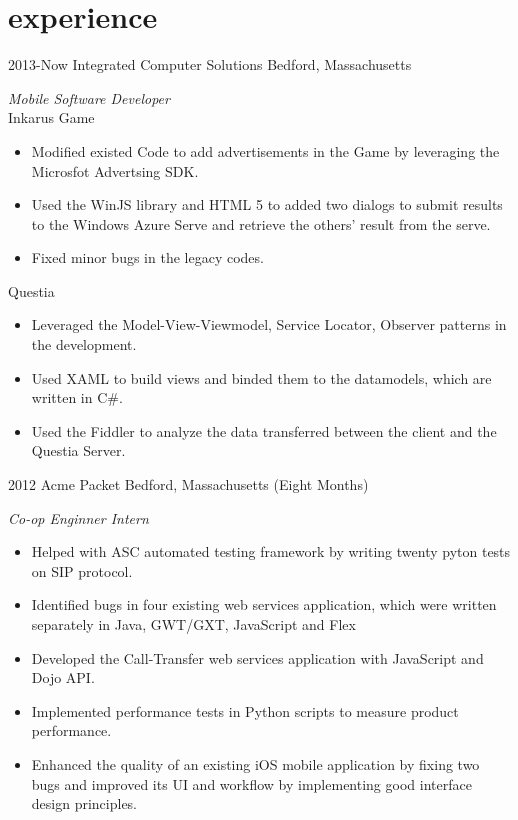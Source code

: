 \documentclass[]{ly-cv} %
\begin{document}
\section{experience}
\begin{entrylist}
\entry
{2013-Now}
{Integrated Computer Solutions}
{Bedford, Massachusetts}
{\emph{Mobile Software Developer}\\
Inkarus Game
\begin{itemize}
  \item Modified existed Code to add advertisements in the Game by leveraging the Microsfot Advertsing SDK.
  \item Used the WinJS library and HTML 5 to added two dialogs to submit results to the Windows Azure Serve and retrieve the others' result from the serve.
  \item Fixed minor bugs in the legacy codes.
\end{itemize}
Questia
\begin{itemize}
  \item Leveraged the Model-View-Viewmodel, Service Locator, Observer patterns in the development.
  \item Used XAML to build views and binded them to the datamodels, which are written in C\#.
  \item Used the Fiddler to analyze the data transferred between the client and the Questia Server.
\end{itemize}}
\entry
{2012}
{Acme Packet}
{Bedford, Massachusetts \small{(Eight Months)}}
{\emph{Co-op Enginner Intern}
\begin{itemize}
  \item Helped with ASC automated testing framework by writing twenty pyton tests on SIP protocol.
	\item Identified bugs in four existing web services application, which were written separately in Java, GWT/GXT, JavaScript and Flex
  \item Developed the Call-Transfer web services application with JavaScript and Dojo API.
	\item Implemented performance tests in Python scripts to measure product performance.
  \item Enhanced the quality of an existing iOS mobile application by fixing two bugs and improved its UI and workflow by implementing good interface design principles.
\end{itemize}}

\end{entrylist}
\end{document}
